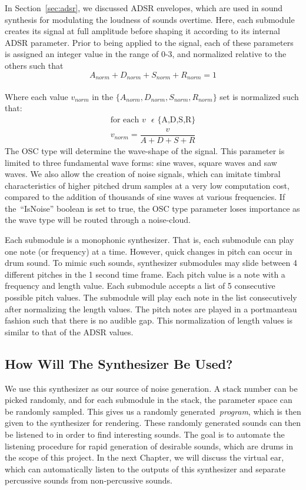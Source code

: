 \documentclass[\main/thesis.tex]{subfiles}
\begin{document}
In Section~\ref{sec:adsr}, we discussed ADSR envelopes, which are used in sound synthesis for modulating the loudness of sounds overtime. Here, each submodule creates its signal at full amplitude before shaping it according to its internal ADSR parameter. Prior to being applied to the signal, each of these parameters is assigned an integer value in the range of 0-3, and normalized relative to the others such that \[ A_{norm} + D_{norm} + S_{norm} + R_{norm} = 1 \] \\ 
Where each value $v_{norm}$ in the $\{A_{norm}, D_{norm},S_{norm},R_{norm}\} $ set is normalized such that:
\begin{align*}
\text{for each $v$ $\epsilon$ \{A,D,S,R\}} \\
v_{norm} = \dfrac{v}{A + D + S + R}
\end{align*}
 The OSC type will determine the wave-shape of the signal. This parameter is limited to three fundamental wave forms: sine waves, square waves and saw waves. We also allow the creation of noise signals, which can imitate timbral characteristics of higher pitched drum samples at a very low computation cost, compared to the addition of thousands of sine waves at various frequencies. If the~\enquote{IsNoise} boolean is set to true, the OSC type parameter loses importance as the wave type will be routed through a noise-cloud. 

Each submodule is a monophonic synthesizer. That is, each submodule can play one note (or frequency) at a time. However, quick changes in pitch can occur in drum sound.  To mimic such sounds, synthesizer submodules may slide between 4 different pitches in the 1 second time frame. Each pitch value is a note with a frequency and length value. Each submodule accepts a list of 5 consecutive possible pitch values. The submodule will play each note in the list consecutively after normalizing the length values. The pitch notes are played in a portmanteau fashion such that there is no audible gap. This normalization of length values is similar to that of the ADSR values. 

\subsection{How Will The Synthesizer Be Used?}
We use this synthesizer as our source of noise generation. A stack number can be picked randomly, and for each submodule in the stack, the parameter space can be randomly sampled. This gives us a randomly generated~\textit{program}, which is then given to the synthesizer for rendering. These randomly generated sounds can then be listened to in order to find interesting sounds. The goal is to automate the listening procedure for rapid generation of desirable sounds, which are drums in the scope of this project. In the next Chapter, we will discuss the virtual ear, which can automatically listen to the outputs of this synthesizer and separate percussive sounds from non-percussive sounds. 
\end{document}
